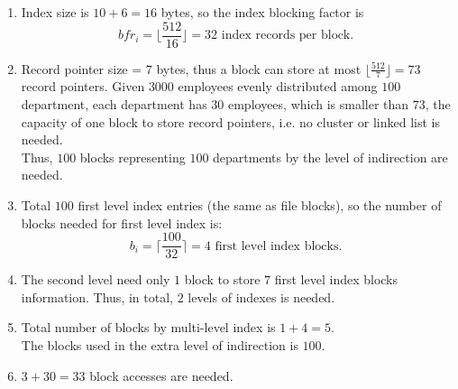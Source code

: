 \begin{homeworkProblem}
\begin{homeworkSubProblem}
    \begin{enumerate}[label=(\roman*)]
        \item Index size is $10+6=16$ bytes, so the index blocking factor is
            \[bfr_i = \bigg\lfloor\frac{512}{16}\bigg\rfloor = 32
            \text{ index records per block. }\]
        \item Record pointer size = 7 bytes, thus a block can store
            at most $\displaystyle\bigg\lfloor\frac{512}{7}\bigg\rfloor = 73$
            record pointers. Given $3000$ employees evenly distributed among
            $100$ department, each department has $30$ employees, which is
            smaller than $73$, the capacity of one block to store record pointers,
            i.e. no cluster or linked list is needed.\\
            Thus, $100$ blocks representing $100$ departments by the level
            of indirection are needed.
        \item Total $100$ first level index entries (the same as file blocks),
            so the number of blocks needed for first level index is:
            \[b_i = \bigg\lceil\frac{100}{32}\bigg\rceil = 4 \text{ first level index blocks. }\]
        \item The second level need only $1$ block to store $7$ first level
            index blocks information. Thus, in total, $2$ levels of indexes
            is needed.
        \item Total number of blocks by multi-level index is $1 + 4 = 5$.\\
            The blocks used in the extra level of indirection is $100$.
        \item $3+30=33$ block accesses are needed.
    \end{enumerate}
\end{homeworkSubProblem}


\end{homeworkProblem}
